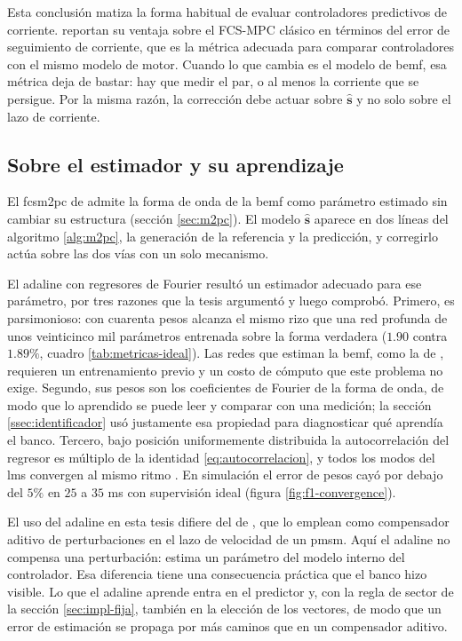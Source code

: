 \documentclass[../../../Tesis_JALS_Maestria.tex]{subfiles}
\begin{document}
Esta conclusión matiza la forma habitual de evaluar controladores predictivos de corriente. \citet{coronado2025} reportan su ventaja sobre el FCS-MPC clásico en términos del error de seguimiento de corriente, que es la métrica adecuada para comparar controladores con el mismo modelo de motor. Cuando lo que cambia es el modelo de \acrshort{bemf}, esa métrica deja de bastar: hay que medir el par, o al menos la corriente que se persigue. Por la misma razón, la corrección debe actuar sobre $\hat{\mathbf{s}}$ y no solo sobre el lazo de corriente.

\subsection{Sobre el estimador y su aprendizaje}

El \acrshort{fcsm2pc} de \citet{coronado2025} admite la forma de onda de la \acrshort{bemf} como parámetro estimado sin cambiar su estructura (sección \ref{sec:m2pc}). El modelo $\hat{\mathbf{s}}$ aparece en dos líneas del algoritmo \ref{alg:m2pc}, la generación de la referencia y la predicción, y corregirlo actúa sobre las dos vías con un solo mecanismo.

El \acrshort{adaline} con regresores de Fourier resultó un estimador adecuado para ese parámetro, por tres razones que la tesis argumentó y luego comprobó. Primero, es parsimonioso: con cuarenta pesos alcanza el mismo rizo que una red profunda de unos veinticinco mil parámetros entrenada sobre la forma verdadera ($1.90$ contra $1.89\%$, cuadro \ref{tab:metricas-ideal}). Las redes que estiman la \acrshort{bemf}, como la de \citet{ali2024ann}, requieren un entrenamiento previo y un costo de cómputo que este problema no exige. Segundo, sus pesos son los coeficientes de Fourier de la forma de onda, de modo que lo aprendido se puede leer y comparar con una medición; la sección \ref{ssec:identificador} usó justamente esa propiedad para diagnosticar qué aprendía el banco. Tercero, bajo posición uniformemente distribuida la autocorrelación del regresor es múltiplo de la identidad \eqref{eq:autocorrelacion}, y todos los modos del \acrshort{lms} convergen al mismo ritmo \citep{widrow1985adaptive, haykin2014adaptive}. En simulación el error de pesos cayó por debajo del $5\%$ en $25$ a $35$ ms con supervisión ideal (figura \ref{fig:f1-convergence}).

El uso del \acrshort{adaline} en esta tesis difiere del de \citet{zhao2025adaline}, que lo emplean como compensador aditivo de perturbaciones en el lazo de velocidad de un \acrshort{pmsm}. Aquí el \acrshort{adaline} no compensa una perturbación: estima un parámetro del modelo interno del controlador. Esa diferencia tiene una consecuencia práctica que el banco hizo visible. Lo que el \acrshort{adaline} aprende entra en el predictor y, con la regla de sector de la sección \ref{sec:impl-fija}, también en la elección de los vectores, de modo que un error de estimación se propaga por más caminos que en un compensador aditivo.
\end{document}
